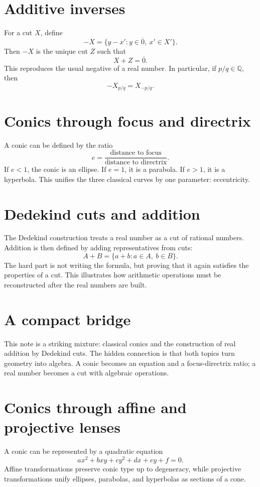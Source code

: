 \section{Additive inverses}

For a cut \(X\), define
\[
  -X=\{y-x':y\in\overline0,\ x'\in X'\}.
\]
Then \(-X\) is the unique cut \(Z\) such that
\[
  X+Z=\overline0.
\]
This reproduces the usual negative of a real number.  In particular, if \(p/q\in\mathbb Q\), then
\[
  -X_{p/q}=X_{-p/q}.
\]


\section{Conics through focus and directrix}

A conic can be defined by the ratio
\[
  e=\frac{\text{distance to focus}}{\text{distance to directrix}}.
\]
If \(e<1\), the conic is an ellipse.  If \(e=1\), it is a parabola.  If \(e>1\), it is a hyperbola.  This unifies the three classical curves by one parameter: eccentricity.

\section{Dedekind cuts and addition}

The Dedekind construction treats a real number as a cut of rational numbers.  Addition is then defined by adding representatives from cuts:
\[
  A+B=\{a+b:a\in A,\ b\in B\}.
\]
The hard part is not writing the formula, but proving that it again satisfies the properties of a cut.  This illustrates how arithmetic operations must be reconstructed after the real numbers are built.

\section{A compact bridge}

This note is a striking mixture: classical conics and the construction of real addition by Dedekind cuts.  The hidden connection is that both topics turn geometry into algebra.  A conic becomes an equation and a focus-directrix ratio; a real number becomes a cut with algebraic operations.

\section{Conics through affine and projective lenses}

A conic can be represented by a quadratic equation
\[
  ax^2+bxy+cy^2+dx+ey+f=0.
\]
Affine transformations preserve conic type up to degeneracy, while projective transformations unify ellipses, parabolas, and hyperbolas as sections of a cone.

